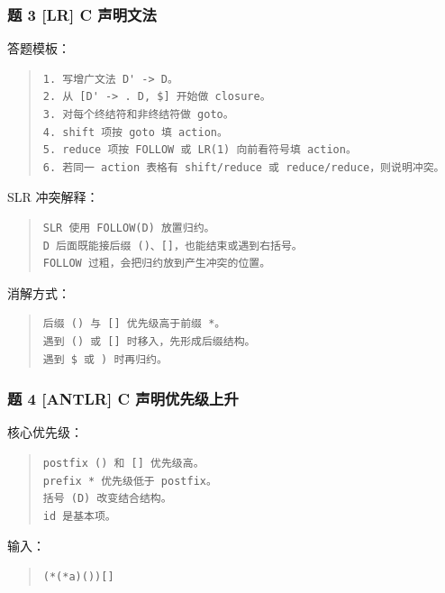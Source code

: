 \documentclass[UTF8,zihao=-4]{ctexart}
\begin{document}
\subsubsection{题 3 [LR] C 声明文法}


答题模板：


\begin{quote}
\footnotesize
\begin{verbatim}
1. 写增广文法 D' -> D。
2. 从 [D' -> . D, $] 开始做 closure。
3. 对每个终结符和非终结符做 goto。
4. shift 项按 goto 填 action。
5. reduce 项按 FOLLOW 或 LR(1) 向前看符号填 action。
6. 若同一 action 表格有 shift/reduce 或 reduce/reduce，则说明冲突。
\end{verbatim}
\end{quote}


SLR 冲突解释：


\begin{quote}
\footnotesize
\begin{verbatim}
SLR 使用 FOLLOW(D) 放置归约。
D 后面既能接后缀 ()、[]，也能结束或遇到右括号。
FOLLOW 过粗，会把归约放到产生冲突的位置。
\end{verbatim}
\end{quote}


消解方式：


\begin{quote}
\footnotesize
\begin{verbatim}
后缀 () 与 [] 优先级高于前缀 *。
遇到 () 或 [] 时移入，先形成后缀结构。
遇到 $ 或 ) 时再归约。
\end{verbatim}
\end{quote}


\subsubsection{题 4 [ANTLR] C 声明优先级上升}


核心优先级：


\begin{quote}
\footnotesize
\begin{verbatim}
postfix () 和 [] 优先级高。
prefix * 优先级低于 postfix。
括号 (D) 改变结合结构。
id 是基本项。
\end{verbatim}
\end{quote}


输入：


\begin{quote}
\footnotesize
\begin{verbatim}
(*(*a)())[]
\end{verbatim}
\end{quote}
\end{document}
